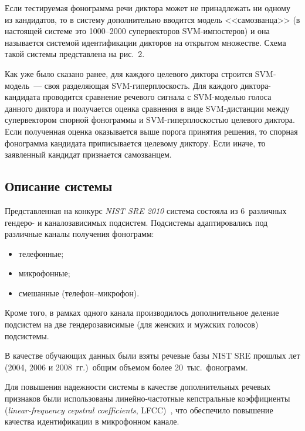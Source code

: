\begin{multicols}{2}
  Если тестируемая фонограмма речи диктора может не принадлежать ни одному 
из кандидатов, то в систему дополнительно вводится модель <<самозванца>> (в 
настоящей системе это 1000--2000 супервекторов SVM-им\-пос\-те\-ров) и она 
называется системой идентификации дикторов на открытом множестве. Схема 
такой системы представлена на рис.~2.
  

  
  Как уже было сказано ранее, для каждого целевого диктора строится 
SVM-мо\-дель~--- своя разделяющая SVM-ги\-пер\-плос\-кость. Для 
каждого дик\-то\-ра-кан\-ди\-да\-та проводится сравнение речевого сигнала с 
SVM-мо\-делью голоса данного диктора и получается оценка сравнения в 
виде SVM-дис\-тан\-ции между супервектором спорной фонограммы и 
  SVM-ги\-пер\-плос\-костью целевого диктора. Если полученная оценка 
оказывается выше порога принятия решения, то спорная фонограмма кандидата 
приписывается целевому диктору. Если иначе, то заявленный кандидат 
признается самозванцем.

\vspace*{-6pt}

\subsection{Описание системы} %
  
  Представленная на конкурс \textit{NIST SRE 2010} сис\-те\-ма состояла из 
6~различных гендеро- и каналозависимых подсистем. Подсистемы 
адаптировались под различные каналы получения фонограмм:\\[-15pt]
  \begin{itemize}
\item телефонные;\\[-15pt]
\item микрофонные;\\[-15pt]
\item смешанные (телефон--мик\-ро\-фон).\\[-15pt]
\end{itemize}

  Кроме того, в рамках одного канала производилось дополнительное деление 
подсистем на две гендерозависимые (для женских и мужских голосов) 
подсистемы. 
  
  В качест\-ве обучающих данных \mbox{были} взяты ре\-че\-вые базы {NIST SRE} 
прошлых лет (2004, 2006 и 2008~гг.)\ общим объемом более 20~тыс.\ фонограмм.
  
  Для повышения надежности системы в каче\-ст\-ве дополнительных речевых 
признаков \mbox{были} использованы ли\-ней\-но-час\-тот\-ные кепстральные 
коэффициенты (\textit{linear-frequency cepstral coefficients}, LFCC)~\cite{2b}, что 
обеспечило повышение качества идентификации в микрофонном канале. 
 \begin{figure*} %
     \vspace*{1pt}
 \begin{center}
 \mbox{%
 \epsfxsize=134.412mm
 }
 \end{center}
 \vspace*{-9pt}
  \end{figure*}


\end{multicols}
